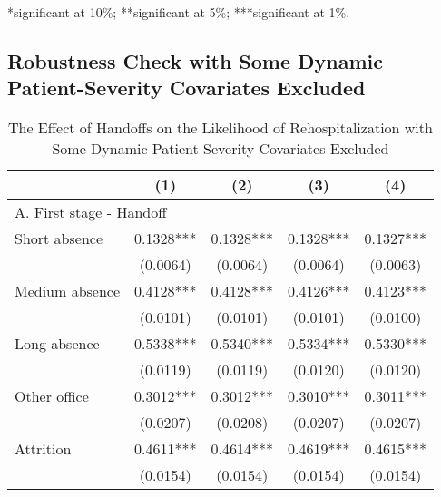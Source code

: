 \documentclass[final,12pt, notitlepage]{article}
\begin{document}
\begin{singlespace}
\begin{table}[H]
\begin{threeparttable}
\begin{tablenotes}
	*significant at 10\%; **significant at 5\%; ***significant at 1\%.
	\end{tablenotes}
\end{threeparttable}
\end{table}


\subsection{Robustness Check with Some Dynamic Patient-Severity Covariates Excluded} \label{appendix:iv_noendog}

\clearpage
\begin{table}[H]
\footnotesize
\setlength\tabcolsep{0pt}
\centering
\caption{The Effect of Handoffs on the Likelihood of Rehospitalization with Some Dynamic Patient-Severity Covariates Excluded}
\label{tab:iv_noendog}
\begin{threeparttable}
{
\def\sym#1{\ifmmode^{#1}\else\(^{#1}\)\fi}
\begin{tabular*}{\textwidth}{l@{\extracolsep{\fill}}*{4}{c}} %
\toprule
                    &\multicolumn{1}{c}{(1)}&\multicolumn{1}{c}{(2)}&\multicolumn{1}{c}{(3)}&\multicolumn{1}{c}{(4)}\\
\midrule
\multicolumn{5}{l}{A. First stage - Handoff} \\
Short absence       &      0.1328***&      0.1328***&      0.1328***&      0.1327***\\
                    &    (0.0064)   &    (0.0064)   &    (0.0064)   &    (0.0063)   \\
Medium absence      &      0.4128***&      0.4128***&      0.4126***&      0.4123***\\
                    &    (0.0101)   &    (0.0101)   &    (0.0101)   &    (0.0100)   \\
Long absence        &      0.5338***&      0.5340***&      0.5334***&      0.5330***\\
                    &    (0.0119)   &    (0.0119)   &    (0.0120)   &    (0.0120)   \\
Other office        &      0.3012***&      0.3012***&      0.3010***&      0.3011***\\
                    &    (0.0207)   &    (0.0208)   &    (0.0207)   &    (0.0207)   \\
Attrition           &      0.4611***&      0.4614***&      0.4619***&      0.4615***\\
                    &    (0.0154)   &    (0.0154)   &    (0.0154)   &    (0.0154)   \\

\end{tabular*}}
\end{threeparttable}
\end{table}
\end{singlespace}
\end{document}
